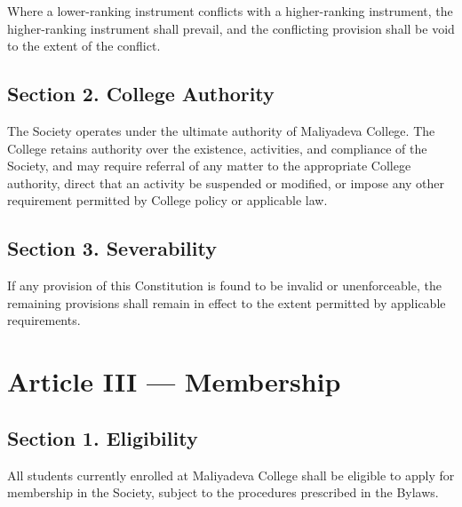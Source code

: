 \documentclass[11pt,a4paper]{article}
\begin{document}
Where a lower-ranking instrument conflicts with a higher-ranking instrument, the higher-ranking instrument shall prevail, and the conflicting provision shall be void to the extent of the conflict.

\subsection*{Section 2. College Authority}
The Society operates under the ultimate authority of Maliyadeva College. The College retains authority over the existence, activities, and compliance of the Society, and may require referral of any matter to the appropriate College authority, direct that an activity be suspended or modified, or impose any other requirement permitted by College policy or applicable law.

\subsection*{Section 3. Severability}
If any provision of this Constitution is found to be invalid or unenforceable, the remaining provisions shall remain in effect to the extent permitted by applicable requirements.

\section*{Article III --- Membership}

\subsection*{Section 1. Eligibility}
All students currently enrolled at Maliyadeva College shall be eligible to apply for membership in the Society, subject to the procedures prescribed in the Bylaws.
\end{document}
